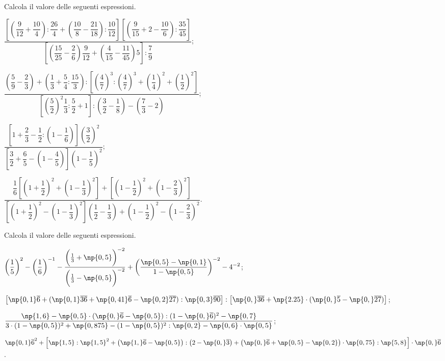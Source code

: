 \begin{esercizio}[\Ast]%
 Calcola il valore delle seguenti espressioni.
\begin{enumeratea}
\spazielenx
\item $\dfrac{\left[\left(\dfrac{9}{12}+\dfrac{10}{4}\right):\dfrac{26}{4}+\left(\dfrac{10}{8}-\dfrac{21}{18}\right):\dfrac{10}{12}\right]\left[\left(\dfrac{9}{15}+2-\dfrac{10}{6}\right):\dfrac{35}{45}\right]}
{\left[\left(\dfrac{15}{25}-\dfrac{2}{6}\right)\dfrac{9}{12}+\left(\dfrac{4}{15}-\dfrac{11}{45}\right)5\right]:\dfrac{7}{9}}$;
\item $\dfrac{\left(\dfrac{5}{9}-\dfrac{2}{3}\right)+\left(\dfrac{1}{3}+\dfrac{5}{4}:\dfrac{15}{3}\right):\left[\left(\dfrac{4}{7}\right)^3:\left(\dfrac{4}{7}\right)^3+\left(\dfrac{1}{4}\right)^2+\left(\dfrac{1}{2}\right)^2\right]}
{\left[\left(\dfrac{5}{2}\right)^2\dfrac{1}{3}:\dfrac{5}{2}+1\right]:\left(\dfrac{3}{2}-\dfrac{1}{8}\right)-\left(\dfrac{7}{3}-2\right)}$;
\item $\dfrac{\left[1+\dfrac{2}{3}-\dfrac{1}{2}:\left(1-\dfrac{1}{6}\right)\right]\left(\dfrac{3}{2}\right)^2}
{\left[\dfrac{3}{2}+\dfrac{6}{5}-\left(1-\dfrac{4}{5}\right)\right]\left(1-\dfrac{1}{5}\right)^2}$;
\item $\dfrac{\dfrac{1}{6}\left[\left(1+\dfrac{1}{2}\right)^2+\left(1-\dfrac{1}{3}\right)^2\right]+\left[\left(1-\dfrac{1}{2}\right)^2+\left(1-\dfrac{2}{3}\right)^2\right]}
{\left[\left(1+\dfrac{1}{2}\right)^2-\left(1-\dfrac{1}{3}\right)^2\right]\left(\dfrac{1}{2}-\dfrac{1}{3}\right)+\left(1-\dfrac{1}{2}\right)^2-\left(1-\dfrac{2}{3}\right)^2}$.
\end{enumeratea}
\end{esercizio}

\begin{esercizio}[\Ast]%
 Calcola il valore delle seguenti espressioni.
\begin{enumeratea}
\spazielenx
\item $\displaystyle{\bigg(\frac{1}{5}\bigg)^{2}-\bigg(\frac{1}{6}\bigg)^{-1}-\frac{\bigg(\frac{1}{3}+\np{0,5}\bigg)^{-2}}%
{\bigg(\frac{1}{3}-\np{0,5}\bigg)^{-2}}+\bigg(\frac{\np{0,5}-\np{0,1}}{1-\np{0,5}}\bigg)^{-2}-4^{-2}}$;
\item $\displaystyle{\left[\np{0,1}\overline{6}+(\np{0,1}\overline{36}+\np{0,41}\overline{6}-\np{0,2}\overline{27}):\np{0,3}\overline{90}\right]:%
\left[\np{0,}\overline{36}+\np{2.25}\cdot(\np{0,}\overline{5}-\np{0,}\overline{27})\right]}$;
\item $\displaystyle{\frac{\np{1,6}-\np{0,5}\cdot(\np{0,}\overline{6}-\np{0,5}):(1-\np{0,}\overline{6})^{2}-\np{0,7}}%
{3\cdot(1-\np{0,5})^{2}+\np{0,875}-(1-\np{0,5})^{2}:\np{0,2}-\np{0,6}\cdot\np{0,5}}}$;
\item $\displaystyle{{\np{0,1}\overline{{6}}}^{2}+\left[\np{1,5}:\np{1,5}^{2}+\left(\np{1,}\overline{6}-\np{0,5}\right):\left(2-\np{0,}\overline{3}\right)%
+\left(\np{0,}\overline{{6}}+\np{0,5}-\np{0,2}\right)\cdot\np{0,75}:\np{5,8}\right]\cdot \np{0,}\overline{{6}}}$.
\end{enumeratea}
\end{esercizio}

